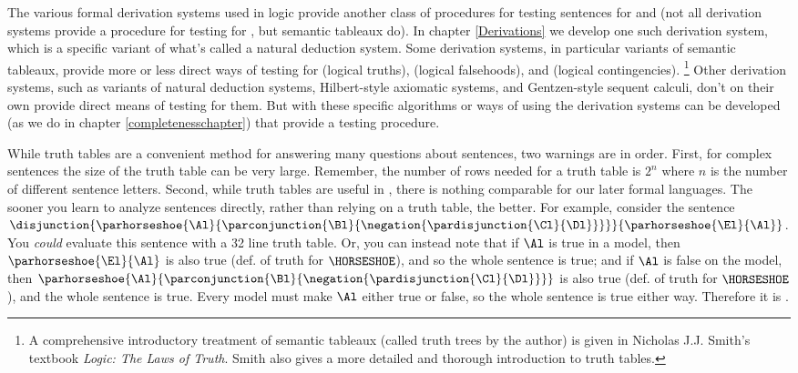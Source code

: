The various formal derivation systems used in logic provide another class of procedures for testing \GSL{} sentences for  and  (not all derivation systems provide a procedure for testing for , but semantic tableaux do). 
In chapter \ref{Derivations} we develop one such derivation system, which is a specific variant of what's called a natural deduction system. 
Some derivation systems, in particular variants of semantic tableaux, provide more or less direct ways of testing for  (logical truths),  (logical falsehoods), and  (logical contingencies).%
\footnote{%
A comprehensive introductory treatment of semantic tableaux (called truth trees by the author) is given in Nicholas J.J. Smith's \citeyearpar{Smith2012} textbook \emph{Logic: The Laws of Truth}. 
Smith also gives a more detailed and thorough introduction to truth tables. 
}
Other derivation systems, such as variants of natural deduction systems, Hilbert-style axiomatic systems, and Gentzen-style sequent calculi, don't on their own provide direct means of testing for them. 
But with these specific algorithms or ways of using the derivation systems can be developed (as we do in chapter \ref{completenesschapter}) that provide a testing procedure. 

While truth tables are a convenient method for answering many questions about \GSL{} sentences, two warnings are in order.  First, for complex sentences the size of the truth table can be very large.  Remember, the number of rows needed for a truth table is $2^n$ where $n$ is the number of different sentence letters.  Second, while truth tables are useful in \GSL{}, there is nothing comparable for our later formal languages.  The sooner you learn to analyze sentences directly, rather than relying on a truth table, the better.  For example, consider the sentence $\disjunction{\parhorseshoe{\Al}{\parconjunction{\Bl}{\negation{\pardisjunction{\Cl}{\Dl}}}}}{\parhorseshoe{\El}{\Al}}$.  You \emph{could} evaluate this sentence with a 32 line truth table.  Or, you can instead note that if $\Al$ is true in a model, then $\parhorseshoe{\El}{\Al}$ is also true (def. of truth for $\HORSESHOE$), and so the whole sentence is true; and if $\Al$ is false on the model, then $\parhorseshoe{\Al}{\parconjunction{\Bl}{\negation{\pardisjunction{\Cl}{\Dl}}}}$ is also true (def. of truth for $\HORSESHOE$), and the whole sentence is true.  Every model must make $\Al$ either true or false, so the whole sentence is true either way.  Therefore it is .


